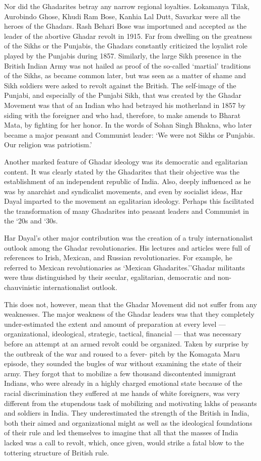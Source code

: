 Nor did the Ghadarites betray any narrow regional loyalties. Lokamanya Tilak, Aurobindo Ghose, Khudi Ram Bose, Kanhia Lal Dutt, Savarkar were all the heroes of the Ghadars. Rash Behari Bose was importuned and accepted as the leader of the abortive Ghadar revolt in 1915. Far from dwelling on the greatness of the Sikhs or the Punjabis, the Ghadars constantly criticized the loyalist role played by the Punjabis during 1857. Similarly, the large Sikh presence in the British Indian Army was not hailed as proof of the so-called `martial' traditions of the Sikhs, as became common later, but was seen as a matter of shame and Sikh soldiers were asked to revolt against the British. The self-image of the Punjabi, and especially of the Punjabi Sikh, that was created by the Ghadar Movement was that of an Indian who had betrayed his motherland in 1857 by siding with the foreigner and who had, therefore, to make amends to Bharat Mata, by fighting for her honor. In the words of Sohan Singh Bhakna, who later became a major peasant and Communist leader: `We were not Sikhs or Punjabis. Our religion was patriotism.'

Another marked feature of Ghadar ideology was its democratic and egalitarian content. It was clearly stated by the Ghadarites that their objective was the establishment of an independent republic of India. Also, deeply influenced as he was by anarchist and syndicalist movements, and even by socialist ideas, Har Dayal imparted to the movement an egalitarian ideology. Perhaps this facilitated the transformation of many Ghadarites into peasant leaders and Communist in the `20s and `30s.

Har Dayal's other major contribution was the creation of a truly internationalist outlook among the Ghadar revolutionaries. His lectures and articles were full of references to Irish, Mexican, and Russian revolutionaries. For example, he referred to Mexican revolutionaries as `Mexican Ghadarites.''Ghadar militants were thus distinguished by their secular, egalitarian, democratic and non-chauvinistic internationalist outlook.

This does not, however, mean that the Ghadar Movement did not suffer from any weaknesses. The major weakness of the Ghadar leaders was that they completely under-estimated the extent and amount of preparation at every level — organizational, ideological, strategic, tactical, financial — that was necessary before an attempt at an armed revolt could be organized. Taken by surprise by the outbreak of the war and roused to a fever- pitch by the Komagata Maru episode, they sounded the bugles of war without examining the state of their army. They forgot that to mobilize a few thousand discontented immigrant Indians, who were already in a highly charged emotional state because of the racial discrimination they suffered at me hands of white foreigners, was very different from the stupendous task of mobilizing and motivating lakhs of peasants and soldiers in India. They underestimated the strength of the British in India, both their aimed and organizational might as well as the ideological foundations of their rule and led themselves to imagine that all that the masses of India lacked was a call to revolt, which, once given, would strike a fatal blow to the tottering structure of British rule.

